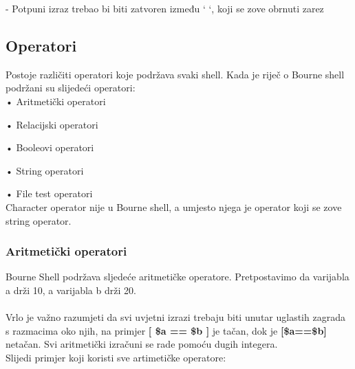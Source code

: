 \documentclass[11pt]{book}
\begin{document}
	- Potpuni izraz trebao bi biti zatvoren između ‘ ‘, koji se zove obrnuti zarez

 

\subsection{Operatori}

Postoje različiti operatori koje podržava svaki shell. Kada je riječ o Bourne shell podržani su slijedeći operatori:\\

•	Aritmetički operatori 

•	Relacijski operatori 

•	Booleovi operatori 

•	String operatori 

•	File test operatori\\

Character operator nije u Bourne shell, a umjesto njega je operator koji se zove string operator.

\subsubsection{Aritmetički operatori}

Bourne Shell podržava sljedeće aritmetičke operatore. Pretpostavimo da varijabla a drži 10, a varijabla b drži 20.\\
\\

Vrlo je važno razumjeti da svi uvjetni izrazi trebaju biti unutar uglastih zagrada s razmacima oko njih, na primjer \textbf{[ \$a == \$b ]} je tačan, dok je \textbf{[\$a==\$b]} netačan. 
Svi aritmetički izračuni se rade pomoću dugih integera.\\

Slijedi primjer koji koristi sve artimetičke operatore:\\

\\
\end{document}
